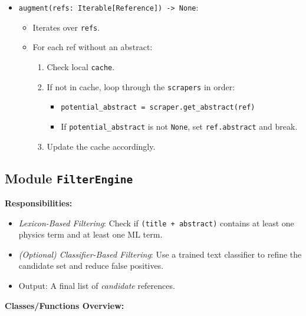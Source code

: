 \documentclass[12pt]{article}
\begin{document}
\begin{description}
\begin{itemize}
    \item \texttt{augment(refs: Iterable[Reference]) -> None}: 
    \begin{itemize}
      \item Iterates over \texttt{refs}.
      \item For each ref without an abstract:
        \begin{enumerate}
          \item Check local \texttt{cache}.
          \item If not in cache, loop through the \texttt{scrapers} in order:
            \begin{itemize}
              \item \texttt{potential\_abstract = scraper.get\_abstract(ref)}
              \item If \texttt{potential\_abstract} is not \texttt{None}, set \texttt{ref.abstract} and break.
            \end{itemize}
          \item Update the cache accordingly.
        \end{enumerate}
    \end{itemize}
  \end{itemize}
\end{description}

\subsection{Module \texttt{FilterEngine}}
\textbf{Responsibilities:}
\begin{itemize}
  \item \emph{Lexicon-Based Filtering}: Check if \texttt{(title + abstract)} contains at least one physics term and at least one ML term.
  \item \emph{(Optional) Classifier-Based Filtering}: Use a trained text classifier to refine the candidate set and reduce false positives.
  \item Output: A final list of \emph{candidate} references.
\end{itemize}

\textbf{Classes/Functions Overview:}
\end{document}
